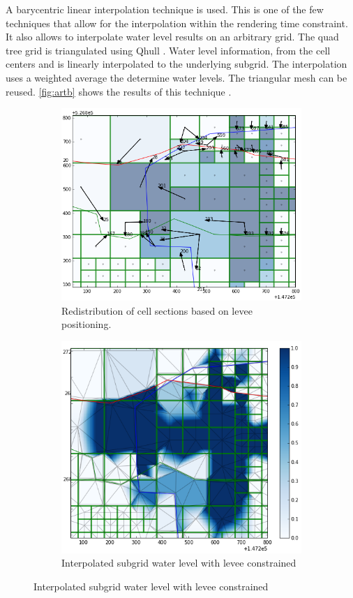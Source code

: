 \documentclass[a4paper]{article}
\begin{document}
A barycentric linear interpolation technique is used. This is one of the few techniques that allow for the interpolation within the rendering time constraint. It also allows to interpolate water level results on an arbitrary grid. The quad tree grid is triangulated using Qhull \citep{Barber1996}.  Water level information, from the cell centers and is linearly interpolated to the underlying subgrid. The interpolation uses a weighted average the determine water levels. The triangular mesh can be reused.   \autoref{fig:artb} shows the results of this technique .

\begin{figure}[htbp]
  \centering
  \begin{subfigure}{0.4\textwidth}
    \includegraphics[width=1\textwidth]{levees1}
    \caption{Redistribution of cell sections based on levee positioning.}
    \label{fig:levee1}
  \end{subfigure}
  \begin{subfigure}{0.4\textwidth}
    \includegraphics[width=1\textwidth]{levees2}
    \caption{Interpolated subgrid water level with levee constrained}
    \label{fig:levee2}
  \end{subfigure}
  \label{fig:levees}


\end{figure}
\end{document}
